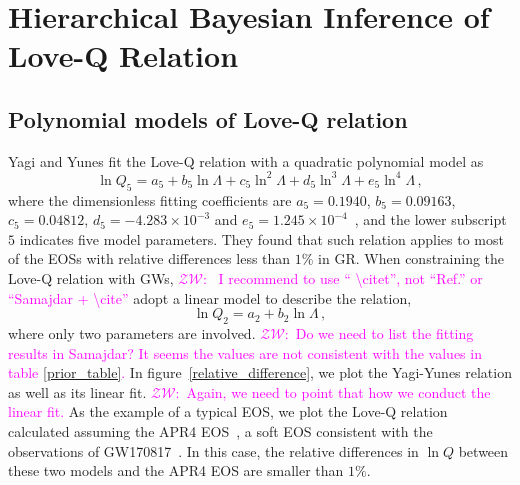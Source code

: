 \documentclass[a4paper,11pt]{article}
\newcommand{\ZW}[1]{\textcolor{magenta}{$\mathcal{ZW}$:~#1}}
\begin{document}
\section{Hierarchical Bayesian Inference of Love-Q Relation}
\label{sec:framework}

\subsection{Polynomial models of Love-Q relation} 
\label{subsec:framework_parameterization}
Yagi and Yunes fit the Love-Q relation with a quadratic polynomial model as~\cite{Yagi:2013bca,Yagi:2013awa,Yagi_2017}
\begin{equation}
\label{5-d_Love_Q_eq}
    \ln Q_{5}=a_5 + b_5 \ln \Lambda + c_5 \ln^2\Lambda + d_5 \ln^3\Lambda + e_5 \ln^4 \Lambda\,,
\end{equation}
where the dimensionless fitting coefficients are 
$a_5=0.1940$, $b_5=0.09163$, $c_5=0.04812$, 
$d_5=-4.283\times 10^{-3}$ and $e_5=1.245\times 10^{-4}$~\cite{Yagi_2017}, and 
the lower subscript $5$ indicates five model parameters.
They found that such relation applies to most of the EOSs with 
relative differences less than $1\%$ in GR. When constraining the Love-Q
relation with GWs, \citet{Samajdar:2020xrd} \ZW{
I recommend to use `` \textbackslash citet'', not ``Ref.'' or ``Samajdar +
\textbackslash cite'' }adopt a linear model to describe the
relation,
\begin{equation}
\label{2-d_Love_Q_eq}
    \ln Q_{2} = a_2 + b_2 \ln \Lambda\,,
\end{equation}
where only two parameters are involved. \ZW{Do we need to list the fitting
results in Samajdar? It seems the values are not consistent with the values in
table \ref{prior_table}.}
In figure~\ref{relative_difference}, we plot the Yagi-Yunes relation as well as 
its linear fit. \ZW{Again, we need to point that how we conduct the linear fit.}
As the example of a typical EOS, we plot the Love-Q relation calculated assuming the APR4 
EOS~\cite{PhysRevC.58.1804}, a soft EOS consistent with the 
observations of GW170817~\cite{LIGOScientific:2017vwq,LIGOScientific:2018cki,
LIGOScientific:2018hze}. In this case, the relative differences in $\ln Q$ between 
these two models and the APR4 EOS are smaller than $1\%$. 
\end{document}
